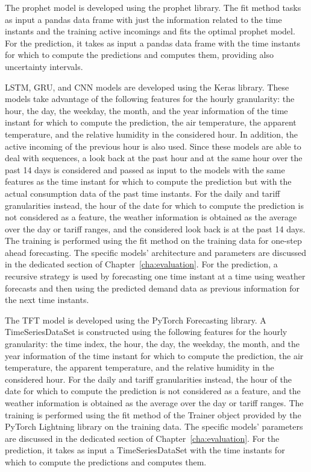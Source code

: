 The prophet model is developed using the prophet library.
The fit method tasks as input a pandas data frame with just the information related to the time instants and the training active incomings and fits the optimal prophet model.
For the prediction, it takes as input a pandas data frame with the time instants for which to compute the predictions and computes them, providing also uncertainty intervals.

LSTM, GRU, and CNN models are developed using the Keras library.
These models take advantage of the following features for the hourly granularity: the hour, the day, the weekday, the month, and the year information of the time instant for which to compute the prediction, the air temperature, the apparent temperature, and the relative humidity in the considered hour.
In addition, the active incoming of the previous hour is also used.
Since these models are able to deal with sequences, a look back at the past hour and at the same hour over the past 14 days is considered and passed as input to the models with the same features as the time instant for which to compute the prediction but with the actual consumption data of the past time instants.
For the daily and tariff granularities instead, the hour of the date for which to compute the prediction is not considered as a feature, the weather information is obtained as the average over the day or tariff ranges, and the considered look back is at the past 14 days.
The training is performed using the fit method on the training data for one-step ahead forecasting.
The specific models' architecture and parameters are discussed in the dedicated section of Chapter~\ref{cha:evaluation}.
For the prediction, a recursive strategy is used by forecasting one time instant at a time using weather forecasts and then using the predicted demand data as previous information for the next time instants.

The TFT model is developed using the PyTorch Forecasting library.
A TimeSeriesDataSet is constructed using the following features for the hourly granularity: the time index, the hour, the day, the weekday, the month, and the year information of the time instant for which to compute the prediction, the air temperature, the apparent temperature, and the relative humidity in the considered hour.
For the daily and tariff granularities instead, the hour of the date for which to compute the prediction is not considered as a feature, and the weather information is obtained as the average over the day or tariff ranges.
The training is performed using the fit method of the Trainer object provided by the PyTorch Lightning library on the training data.
The specific models' parameters are discussed in the dedicated section of Chapter~\ref{cha:evaluation}.
For the prediction, it takes as input a TimeSeriesDataSet with the time instants for which to compute the predictions and computes them.

